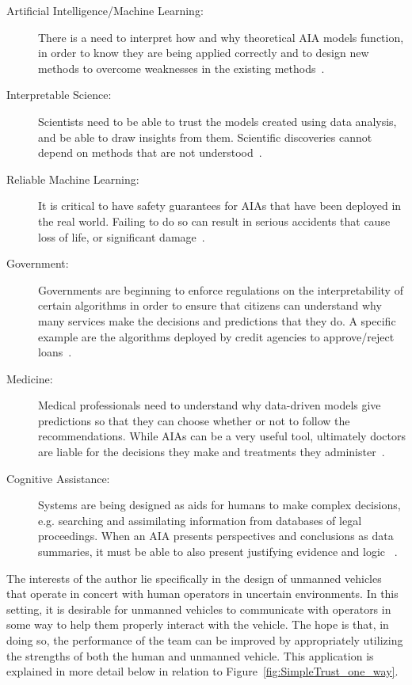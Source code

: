     \begin{description}
        \item [Artificial Intelligence/Machine Learning:] There is a need to interpret how and why theoretical AIA models function, in order to know they are being applied correctly and to design new methods to overcome weaknesses in the existing methods~\cite{Garcia2015-rs,Otte2013-oo}.    
        \item [Interpretable Science:] Scientists need to be able to trust the models created using data analysis, and be able to draw insights from them. Scientific discoveries cannot depend on methods that are not understood~\cite{Faghmous2014-og}.
        \item [Reliable Machine Learning:] It is critical to have safety guarantees for AIAs that have been deployed in the real world. Failing to do so can result in serious accidents that cause loss of life, or significant damage~\cite{Sugiyama2013-ci,Amodei2016-xi}.       
        \item [Government:] Governments are beginning to enforce regulations on the interpretability of certain algorithms in order to ensure that citizens can understand why many services make the decisions and predictions that they do. A specific example are the algorithms deployed by credit agencies to approve/reject loans~\cite{Wagner2016-ck}.
        \item [Medicine:] Medical professionals need to understand why data-driven models give predictions so that they can choose whether or not to follow the recommendations. While AIAs can be a very useful tool, ultimately doctors are liable for the decisions they make and treatments they administer~\cite{Jovanovic2016-gw}.
        \item [Cognitive Assistance:] Systems are being designed as aids for humans to make complex decisions, e.g. searching and assimilating information from databases of legal proceedings. When an AIA presents perspectives and conclusions as data summaries, it must be able to also present justifying evidence and logic ~\cite{Gutfreund2016-xe}.
    \end{description}

    The interests of the author lie specifically in the design of unmanned vehicles that operate in concert with human operators in uncertain environments. In this setting, it is desirable for unmanned vehicles to communicate with operators in some way to help them properly interact with the vehicle. The hope is that, in doing so, the performance of the team can be improved by appropriately utilizing the strengths of both the human and unmanned vehicle. This application is explained in more detail below in relation to Figure~\ref{fig:SimpleTrust_one_way}.

